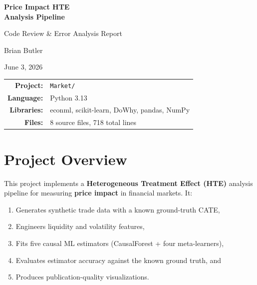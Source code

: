 \documentclass[11pt, letterpaper]{article}
\begin{document}
\begin{titlepage}
    \centering
    \vspace*{2cm}
    {\Huge\bfseries Price Impact HTE\\Analysis Pipeline\par}
    \vspace{0.8cm}
    {\LARGE Code Review \& Error Analysis Report\par}
    \vspace{2cm}
    {\Large Brian Butler\par}
    \vspace{0.5cm}
    {\large June 3, 2026\par}
    \vfill
    {\large
    \begin{tabular}{rl}
        \textbf{Project:}  & \texttt{Market/} \\
        \textbf{Language:} & Python 3.13 \\
        \textbf{Libraries:}& econml, scikit-learn, DoWhy, pandas, NumPy \\
        \textbf{Files:}    & 8 source files, 718 total lines \\
    \end{tabular}
    }
    \vspace{1cm}
\end{titlepage}

\tableofcontents
\newpage

\section{Project Overview}

This project implements a \textbf{Heterogeneous Treatment Effect (HTE)} analysis pipeline for measuring \textbf{price impact} in financial markets. It:

\begin{enumerate}[leftmargin=2em]
    \item Generates synthetic trade data with a known ground-truth CATE,
    \item Engineers liquidity and volatility features,
    \item Fits five causal ML estimators (CausalForest + four meta-learners),
    \item Evaluates estimator accuracy against the known ground truth, and
    \item Produces publication-quality visualizations.
\end{enumerate}
\end{document}
